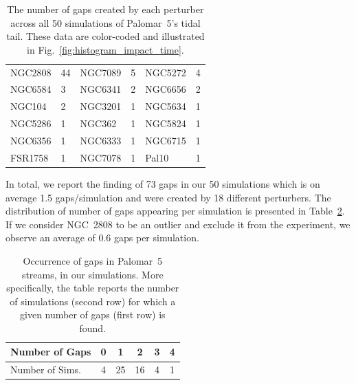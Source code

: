 \documentclass[draft]{aa}
\begin{document}
    \begin{table}[h]
      \centering
      \begin{tabular}{|ll|ll|ll|}
      \hline
      NGC2808 & 44 & NGC7089 & 5 & NGC5272 & 4 \\
      NGC6584 & 3 & NGC6341 & 2 & NGC6656 & 2 \\
      NGC104 & 2 & NGC3201 & 1 & NGC5634 & 1 \\
      NGC5286 & 1 & NGC362 & 1 & NGC5824 & 1 \\
      NGC6356 & 1 & NGC6333 & 1 & NGC6715 & 1 \\
      FSR1758 & 1 & NGC7078 & 1 & Pal10 & 1 \\
      \hline
      \end{tabular}
      \caption{The number of gaps created by each perturber across all 50 simulations of Palomar~5's tidal tail. These data are color-coded and illustrated in Fig.~\ref{fig:histogram_impact_time}.}
      \label{tab:gaps_per_perturber}
    \end{table} 
    
    In total, we report the finding of 73 gaps in our 50 simulations which is on average 1.5 gaps/simulation and were created by 18 different perturbers. The distribution of number of gaps appearing per simulation is presented in Table~\ref{table:gap_distribution}. If we consider NGC~2808 to be an outlier and exclude it from the experiment, we observe an average of 0.6 gaps per simulation.  
    
    \begin{table}[h]
      \centering
        \begin{tabular}{|l|c|c|c|c|c|}
          \hline
          Number of Gaps & 0 & 1 & 2 & 3 & 4 \\
          \hline
          Number of Sims. & 4 & 25 & 16 & 4 & 1 \\
          \hline
        \end{tabular}
        \vspace{0.5cm}
      \caption{Occurrence of gaps in Palomar~5 streams,  in our simulations. More specifically, the table reports the number of simulations (second row) for which a given number of gaps (first row) is found. }\label{table:gap_distribution}
    \end{table}
\end{document}
